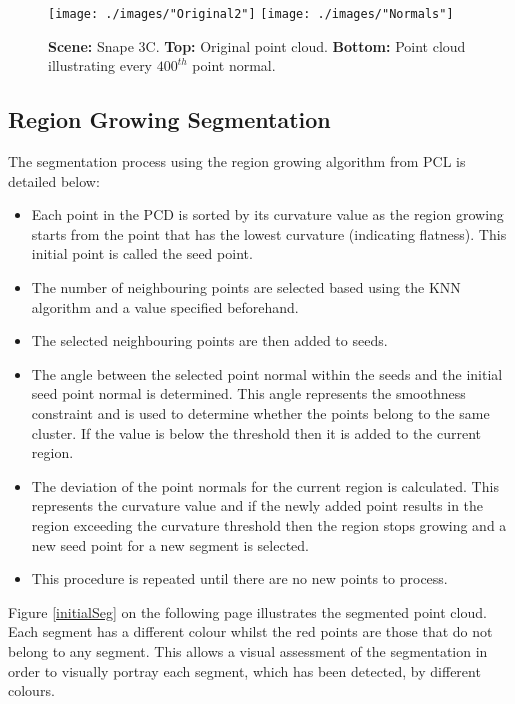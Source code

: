 \clearpage

\begin{sidewaysfigure}[h!]
	\centering
	\texttt{[image: ./images/"Original2"]}
	\texttt{[image: ./images/"Normals"]}
	\caption[Illustration of point normals]{\textbf{Scene:} Snape 3C. \textbf{Top:} Original point cloud. \textbf{Bottom:} Point cloud illustrating every $400^{th}$ point normal.\label{pntnormals}}
\end{sidewaysfigure}

\clearpage

\subsection{Region Growing Segmentation \label{regiongrowing}}

The segmentation process using the region growing algorithm from PCL is detailed below:
\begin{itemize} 
\item Each point in the PCD is sorted by its curvature value as the region growing starts from the point that has the lowest curvature (indicating flatness). This initial point is called the seed point.
\item The number of neighbouring points are selected based using the KNN algorithm and a value specified beforehand.
\item The selected neighbouring points are then added to seeds.
\item The angle between the selected point normal within the seeds and the initial seed point normal is determined. This angle represents the smoothness constraint and is used to determine whether the points belong to the same cluster. If the value is below the threshold then it is added to the current region.
\item The deviation of the point normals for the current region is calculated. This represents the curvature value and if the newly added point results in the region exceeding the curvature threshold then the region stops growing and a new seed point for a new segment is selected.
\item This procedure is repeated until there are no new points to process.
\end{itemize}

Figure \ref{initialSeg} on the following page illustrates the segmented point cloud. Each segment has a different colour whilst the red points are those that do not belong to any segment. This allows a visual assessment of the segmentation in order to visually portray each segment, which has been detected, by different colours.

